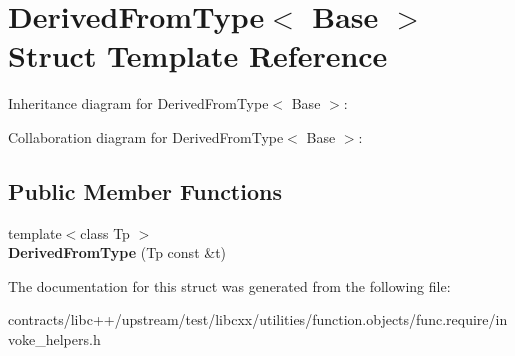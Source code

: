 \hypertarget{struct_derived_from_type}{}\section{Derived\+From\+Type$<$ Base $>$ Struct Template Reference}
\label{struct_derived_from_type}


Inheritance diagram for Derived\+From\+Type$<$ Base $>$\+:


Collaboration diagram for Derived\+From\+Type$<$ Base $>$\+:
\subsection*{Public Member Functions}
\begin{DoxyCompactItemize}
\item 
\mbox{\label{struct_derived_from_type_a310fab5e7b46e4a2df92ff8520de4ac5}} 
{\footnotesize template$<$class Tp $>$ }\\{\bfseries Derived\+From\+Type} (Tp const \&t)
\end{DoxyCompactItemize}


The documentation for this struct was generated from the following file\+:\begin{DoxyCompactItemize}
\item 
contracts/libc++/upstream/test/libcxx/utilities/function.\+objects/func.\+require/invoke\+\_\+helpers.\+h\end{DoxyCompactItemize}
